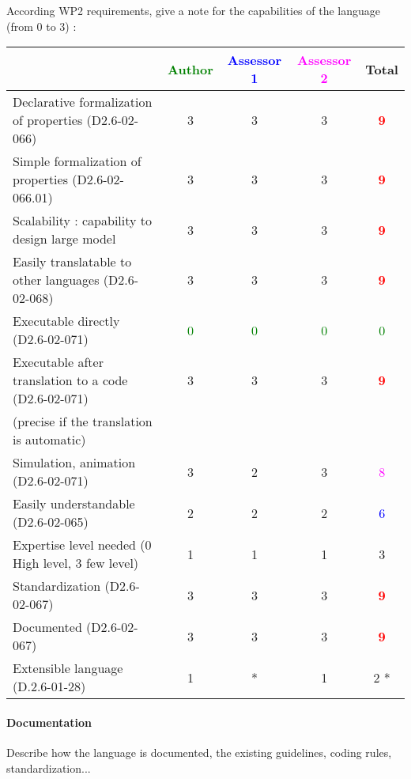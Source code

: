 According WP2 requirements, give a note for the capabilities of the language (from 0 to 3) :

\begin{tabular}{|l | c | c | c | c|}
\hline
& \textcolor{green}{Author} & \textcolor{blue}{Assessor 1} & \textcolor{magenta}{Assessor 2} & Total \\
\hline
Declarative formalization of properties (D2.6-02-066) & 3     & 3     & 3     & \textcolor{red}{\textbf{9}} \\
\hline
Simple formalization of properties (D2.6-02-066.01) & 3     & 3     & 3     & \textcolor{red}{\textbf{9}}  \\
\hline
Scalability : capability to design large model & 3     & 3     & 3     & \textcolor{red}{\textbf{9}} \\
\hline
Easily translatable to other languages (D2.6-02-068) & 3     & 3     & 3     & \textcolor{red}{\textbf{9}} \\
\hline
Executable directly (D2.6-02-071) & \textcolor{green}{0} & \textcolor{green}{0} & \textcolor{green}{0} & \textcolor{green}{0} \\
\hline
Executable after translation to a code (D2.6-02-071) & 3     & 3     & 3     & \textcolor{red}{\textbf{9}} \\
(precise if the translation is automatic) & & & & \\
\hline
Simulation, animation (D2.6-02-071) &  3 & 2     & 3     & \textcolor{magenta}{8} \\
\hline
Easily understandable (D2.6-02-065) & 2     & 2     & 2     & \textcolor{blue}{6} \\
\hline
Expertise level needed (0 High level, 3 few level) &  1 & 1     & 1     & 3     \\
\hline
Standardization (D2.6-02-067) & 3     & 3     & 3     & \textcolor{red}{\textbf{9}} \\
\hline
Documented (D2.6-02-067) & 3     & 3     & 3     & \textcolor{red}{\textbf{9}} \\
\hline
Extensible language (D.2.6-01-28) & 1     & * & 1     & 2    * \\
\hline
\end{tabular}


\paragraph{Documentation} Describe how the language is documented, the existing guidelines, coding rules, standardization...

